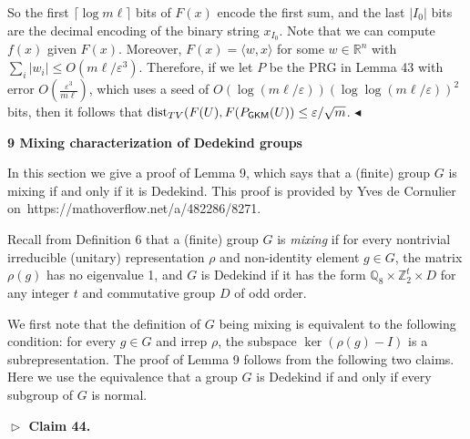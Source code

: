 \documentclass[10pt,a4paper]{article}
\begin{document}
So the first $\lceil\log m\ell\rceil$ bits of $F(x)$ encode the first sum, and the last $\lvert I_{0}\rvert$ bits are the decimal encoding of the binary string $x_{I_{0}}$.
Note that we can compute $f(x)$ given $F(x)$.
Moreover, $F(x)=\langle w,x\rangle$ for some $w\in\mathbb{R}^{n}$ with $\sum_{i}\lvert w_{i}\rvert\leq O(m\ell/\varepsilon^{3})$.
Therefore, if we let $P$ be the PRG in Lemma 43 with error $O(\frac{\varepsilon^{3}}{m\ell})$, which uses a seed of $O(\log(m\ell/\varepsilon))(\log\log(m\ell/\varepsilon))^{2}$ bits, then it follows that $\textnormal{dist}_{TV}(F(U),F(P_{\mathsf{GKM}}(U))\leq\varepsilon/\sqrt{m}$.
$\blacktriangleleft$\par







\par\medskip\noindent\textbf{
9 Mixing characterization of Dedekind groups}\par




In this section we give a proof of Lemma 9, which says that a (finite) group $G$ is mixing if and only if it is Dedekind.
This proof is provided by Yves de Cornulier on https://mathoverflow.net/a/482286/8271.\par




Recall from Definition 6 that a (finite) group $G$ is \emph{mixing} if for every nontrivial irreducible (unitary) representation $\rho$ and non-identity element $g\in G$, the matrix $\rho(g)$ has no eigenvalue 1, and $G$ is Dedekind if it has the form $\mathbb{Q}_{8}\times\mathbb{Z}_{2}^{t}\times D$ for any integer $t$ and commutative group $D$ of odd order.\par




We first note that the definition of $G$ being mixing is equivalent to the following condition: for every $g\in G$ and irrep $\rho$, the subspace $\ker(\rho(g)-I)$ is a subrepresentation.
The proof of Lemma 9 follows from the following two claims.
Here we use the equivalence that a group $G$ is Dedekind if and only if every subgroup of $G$ is normal.\par





\par\medskip\noindent\textbf{
$\vartriangleright$ Claim 44. }\par
\end{document}
